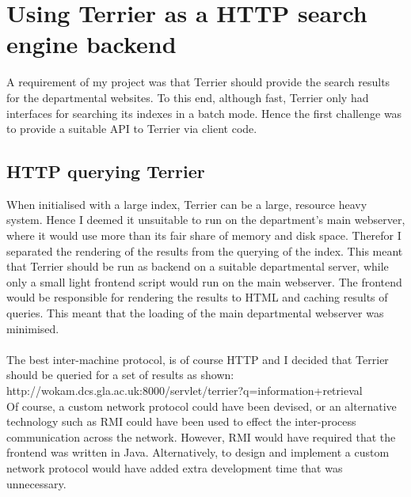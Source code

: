 \section{Using Terrier as a HTTP search engine backend}
A requirement of my project was that Terrier should provide the search results for the departmental websites. To this end, although fast, Terrier only had interfaces for searching its indexes in a batch mode. Hence the first challenge was to provide a suitable API to Terrier via client code.

\subsection{HTTP querying Terrier}

When initialised with a large index, Terrier can be a large, resource heavy system. Hence I deemed it unsuitable to run on the department's main webserver, where it would use more than its fair share of memory and disk space. Therefor I separated the rendering of the results from the querying of the index. This meant that Terrier should be run as backend on a suitable departmental server, while only a small light frontend script would run on the main webserver. The frontend would be responsible for rendering the results to HTML and caching results of queries. This meant that the loading of the main departmental webserver was minimised.\\
\ \\
The best inter-machine protocol, is of course HTTP and I decided that Terrier should be queried for a set of results as shown:\\
\indent http://wokam.dcs.gla.ac.uk:8000/servlet/terrier?q=information+retrieval
\ \\
Of course, a custom network protocol could have been devised, or an alternative technology such as RMI could have been used to effect the inter-process communication across the network. However, RMI would have required that the frontend was written in Java. Alternatively, to design and implement a custom network protocol would have added extra development time that was unnecessary.\\
\ \\
